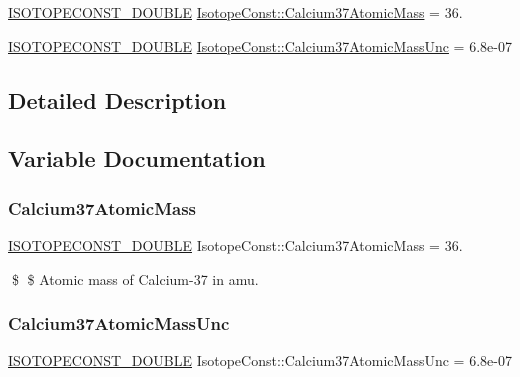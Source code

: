 \begin{DoxyCompactItemize}
\item 
\mbox{\hyperlink{group___isotope_const-_macros_ga8f45a7272ce02c0b4c65c44636ed719a}{I\+S\+O\+T\+O\+P\+E\+C\+O\+N\+S\+T\+\_\+\+D\+O\+U\+B\+LE}} \mbox{\hyperlink{group___isotope_const-_calcium-_ca37_gaeee4c0ef843e1caeed6c693cc1de7bf1}{Isotope\+Const\+::\+Calcium37\+Atomic\+Mass}} = 36.
\item 
\mbox{\hyperlink{group___isotope_const-_macros_ga8f45a7272ce02c0b4c65c44636ed719a}{I\+S\+O\+T\+O\+P\+E\+C\+O\+N\+S\+T\+\_\+\+D\+O\+U\+B\+LE}} \mbox{\hyperlink{group___isotope_const-_calcium-_ca37_ga4b74e434a395022666574ee51e62f638}{Isotope\+Const\+::\+Calcium37\+Atomic\+Mass\+Unc}} = 6.\+8e-\/07
\end{DoxyCompactItemize}


\subsection{Detailed Description}


\subsection{Variable Documentation}
\mbox{\label{group___isotope_const-_calcium-_ca37_gaeee4c0ef843e1caeed6c693cc1de7bf1}} 
\subsubsection{\texorpdfstring{Calcium37\+Atomic\+Mass}{Calcium37AtomicMass}}
{\footnotesize\ttfamily \mbox{\hyperlink{group___isotope_const-_macros_ga8f45a7272ce02c0b4c65c44636ed719a}{I\+S\+O\+T\+O\+P\+E\+C\+O\+N\+S\+T\+\_\+\+D\+O\+U\+B\+LE}} Isotope\+Const\+::\+Calcium37\+Atomic\+Mass = 36.}

\$ \$ Atomic mass of Calcium-\/37 in amu. \mbox{\label{group___isotope_const-_calcium-_ca37_ga4b74e434a395022666574ee51e62f638}} 
\subsubsection{\texorpdfstring{Calcium37\+Atomic\+Mass\+Unc}{Calcium37AtomicMassUnc}}
{\footnotesize\ttfamily \mbox{\hyperlink{group___isotope_const-_macros_ga8f45a7272ce02c0b4c65c44636ed719a}{I\+S\+O\+T\+O\+P\+E\+C\+O\+N\+S\+T\+\_\+\+D\+O\+U\+B\+LE}} Isotope\+Const\+::\+Calcium37\+Atomic\+Mass\+Unc = 6.\+8e-\/07}

